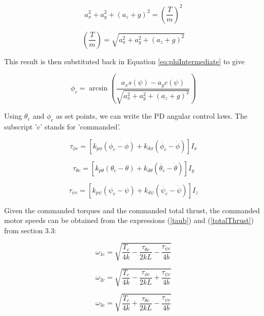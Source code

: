 \begin{equation}
a_x^2 + a_y^2 + (a_z + g)^2 = \left(\frac{T}{m}\right)^2
\end{equation}

\begin{equation}
\left(\frac{T}{m}\right) = \sqrt{a_x^2 + a_y^2 + (a_z + g)^2}
\end{equation}


This result is then substituted back in Equation \eqref{eq:phiIntermediate} to give

\begin{equation}
    \label{eq:phic}
    \phi_c = \arcsin\left( \frac{a_x s(\psi) - a_y c(\psi)}{\sqrt{a_x^2 + a_y^2 + (a_z + g)^2}} \right)
\end{equation}


Using $\theta_c$ and $\phi_c$ as set points, we can write the PD angular control laws. The subscript 'c' stands for 'commanded'.

\begin{equation}
    \tau_{\phi c} = [ k_{p\phi} (\phi_c - \phi) + k_{d\phi} (\dot{\phi_c} - \dot{\phi}) ] I_x
\end{equation}

\begin{equation}
    \tau_{\theta c} = [ k_{p\theta} (\theta_c - \theta) + k_{d\theta} (\dot{\theta_c} - \dot{\theta}) ] I_y
\end{equation}

\begin{equation}
    \tau_{\psi c} = [ k_{p\psi} (\psi_c - \psi) + k_{d\psi} (\dot{\psi_c} - \dot{\psi}) ] I_z
\end{equation}

Given the commanded torques and the commanded total thrust, the commanded motor speeds can be obtained from the expressions (\ref{taub}) and (\ref{totalThrust}) from section 3.3:


\begin{equation}
    \omega_{1c} = \sqrt{ \frac{T_c}{4 k} - \frac{ \tau_{\theta c}}{2 k L} - \frac{ \tau_{\psi c} }{4 b } }
\end{equation}

\begin{equation}
    \omega_{2c} = \sqrt{ \frac{T_c}{4 k} - \frac{ \tau_{\phi c}}{2 k L}   + \frac{ \tau_{\psi c} }{4 b } }
\end{equation}

\begin{equation}
    \omega_{3c} = \sqrt{ \frac{T_c}{4 k} + \frac{ \tau_{\theta c}}{2 k L} - \frac{ \tau_{\psi c} }{4 b } }
\end{equation}

